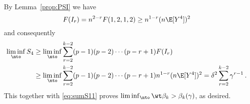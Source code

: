 By Lemma~\ref{prop:PSI} we have 
\begin{equation*}
F(I_r)= n^{2-r} F(1,2,1,2)\ge n^{1-r}(n\E[ Y^4])^2
\end{equation*}and consequently
\begin{equation*}
\begin{split}
\liminf_{\nto} S_4&\ge \liminf_{\nto} \sum_{r=2}^{k-2} (p-1)(p-2)\cdots (p-r+1)  F(I_r)\\
&\ge \liminf_{\nto} \sum_{r=2}^{k-2} (p-1)(p-2)\cdots (p-r+1)  n^{1-r}(n\E[ Y^4])^2=  \delta^2 \sum_{r=2}^{k-2} \gamma^{r-1}\,.
\end{split}
\end{equation*}
This together with \eqref{eq:sumS11} proves $\liminf_{\nto} \wt \beta_k>\beta_k(\gamma)$, as desired.




